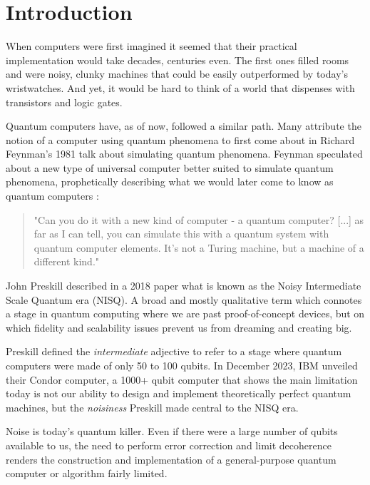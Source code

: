 \chapter{Introduction} \label{Chap1}

When computers were first imagined it seemed that their practical implementation would take decades, centuries even. The first ones filled rooms and were noisy, clunky machines that could be easily outperformed by today's wristwatches. And yet, it would be hard to think of a world that dispenses with transistors and logic gates.

Quantum computers have, as of now, followed a similar path. Many attribute the notion of a computer using quantum phenomena to first come about in Richard Feynman's 1981 talk about simulating quantum phenomena. Feynman speculated about a new type of universal computer better suited to simulate quantum phenomena, prophetically describing what we would later come to know as quantum computers \cite{hey_feynman_2002}:

\begin{quote}
    "Can you do it with a new kind of computer - a quantum computer? [...] as far as I can tell, you can simulate this with a quantum system with quantum computer elements. It's not a Turing machine, but a machine of a different kind."
\end{quote} 

John Preskill described in a 2018 paper what is known as the Noisy Intermediate Scale Quantum era (NISQ). A broad and mostly qualitative term which connotes a stage in quantum computing where we are past proof-of-concept devices, but on which fidelity and scalability issues prevent us from dreaming and creating big.

Preskill defined the \textit{intermediate} adjective to refer to a stage where quantum computers were made of only 50 to 100 qubits. In December 2023, IBM unveiled their Condor computer, a 1000+ qubit computer that shows the main limitation today is not our ability to design and implement theoretically perfect quantum machines, but the \textit{noisiness} Preskill made central to the NISQ era. 

Noise is today's quantum killer. Even if there were a large number of qubits available to us, the need to perform error correction and limit decoherence renders the construction and implementation of a general-purpose quantum computer or algorithm fairly limited.

